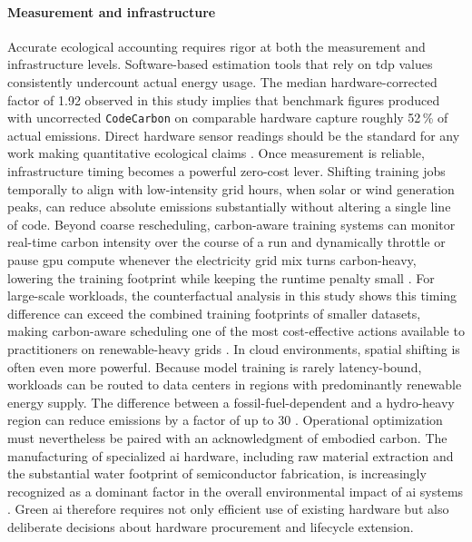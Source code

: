 \paragraph{Measurement and infrastructure}
Accurate ecological accounting requires rigor at both the measurement and infrastructure levels. Software-based estimation tools that rely on \gls{tdp} values consistently undercount actual energy usage. The median hardware-corrected factor of 1.92 observed in this study implies that benchmark figures produced with uncorrected \texttt{CodeCarbon} on comparable hardware capture roughly 52\,\% of actual emissions. Direct hardware sensor readings should be the standard for any work making quantitative ecological claims \cite{rodriguezEvaluatingEnergyConsumption2024}. Once measurement is reliable, infrastructure timing becomes a powerful zero-cost lever. Shifting training jobs temporally to align with low-intensity grid hours, when solar or wind generation peaks, can reduce absolute emissions substantially without altering a single line of code. Beyond coarse rescheduling, carbon-aware training systems can monitor real-time carbon intensity over the course of a run and dynamically throttle or pause \gls{gpu} compute whenever the electricity grid mix turns carbon-heavy, lowering the training footprint while keeping the runtime penalty small \cite{yangChasingLowCarbonElectricity2023}. For large-scale workloads, the counterfactual analysis in this study shows this timing difference can exceed the combined training footprints of smaller datasets, making carbon-aware scheduling one of the most cost-effective actions available to practitioners on renewable-heavy grids \cite{dodgeMeasuringCarbonIntensity2022}. In cloud environments, spatial shifting is often even more powerful. Because model training is rarely latency-bound, workloads can be routed to data centers in regions with predominantly renewable energy supply. The difference between a fossil-fuel-dependent and a hydro-heavy region can reduce emissions by a factor of up to 30 \cite{hendersonSystematicReportingEnergy2020}. Operational optimization must nevertheless be paired with an acknowledgment of embodied carbon. The manufacturing of specialized \gls{ai} hardware, including raw material extraction and the substantial water footprint of semiconductor fabrication, is increasingly recognized as a dominant factor in the overall environmental impact of \gls{ai} systems \cite{eilamMethodologyFrameworkAI2023,wuSustainableAIEnvironmental2022}. Green \gls{ai} therefore requires not only efficient use of existing hardware but also deliberate decisions about hardware procurement and lifecycle extension.

